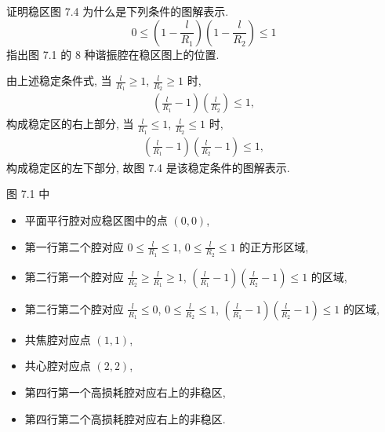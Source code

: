 \documentclass{note}
\begin{document}
\begin{exe}
    证明稳区图 7.4 为什么是下列条件的图解表示.
    \[
        0\leq\left(1-\frac{l}{R_1}\right)\left(1-\frac{l}{R_2}\right)\leq 1
    \]
    指出图 7.1 的 8 种谐振腔在稳区图上的位置.
\end{exe}
\begin{sol}
    由上述稳定条件式, 当 $\frac{l}{R_1}\geq 1$, $\frac{l}{R_2}\geq 1$ 时,
    \begin{align}
        \left(\frac{l}{R_1}-1\right)\left(\frac{l}{R_2}\right)\leq 1,
    \end{align}
    构成稳定区的右上部分,
    当 $\frac{l}{R_1}\leq 1$, $\frac{l}{R_2}\leq 1$ 时,
    \begin{align}
        \left(\frac{l}{R_1}-1\right)\left(\frac{l}{R_2}-1\right)\leq 1,
    \end{align}
    构成稳定区的左下部分,
    故图 7.4 是该稳定条件的图解表示.

    图 7.1 中
    \begin{itemize}
        \item 平面平行腔对应稳区图中的点 $(0,0)$,
        \item 第一行第二个腔对应 $0\leq\frac{l}{R_1}\leq 1$, $0\leq\frac{l}{R_2}\leq 1$ 的正方形区域,
        \item 第二行第一个腔对应 $\frac{l}{R_2}\geq\frac{l}{R_1}\geq 1$, $\left(\frac{l}{R_1}-1\right)\left(\frac{l}{R_2}-1\right)\leq 1$ 的区域,
        \item 第二行第二个腔对应 $\frac{l}{R_1}\leq 0$, $0\leq\frac{l}{R_2}\leq 1$, $\left(\frac{l}{R_1}-1\right)\left(\frac{l}{R_2}-1\right)\leq 1$ 的区域,
        \item 共焦腔对应点 $(1,1)$,
        \item 共心腔对应点 $(2,2)$,
        \item 第四行第一个高损耗腔对应右上的非稳区,
        \item 第四行第二个高损耗腔对应右上的非稳区.
    \end{itemize}
\end{sol}
\end{document}
